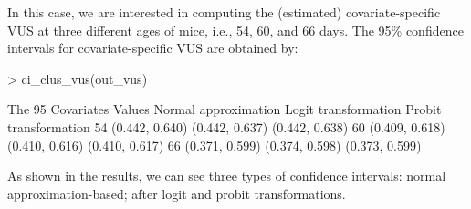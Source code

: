 \noindent
In this case, we are interested in computing the (estimated) covariate-specific VUS at three different ages of mice, i.e., 54, 60, and 66 days. The 95\% confidence intervals for covariate-specific VUS are obtained by:
{
\begin{example}
> ci_clus_vus(out_vus)

The 95%
   Covariates Values  Normal approximation  Logit transformation  Probit transformation
                  54        (0.442, 0.640)        (0.442, 0.637)         (0.442, 0.638)
                  60        (0.409, 0.618)        (0.410, 0.616)         (0.410, 0.617)
                  66        (0.371, 0.599)        (0.374, 0.598)         (0.373, 0.599)
\end{example}
}
\noindent
As shown in the results, we can see three types of confidence intervals: normal approximation-based; after logit and probit transformations.

